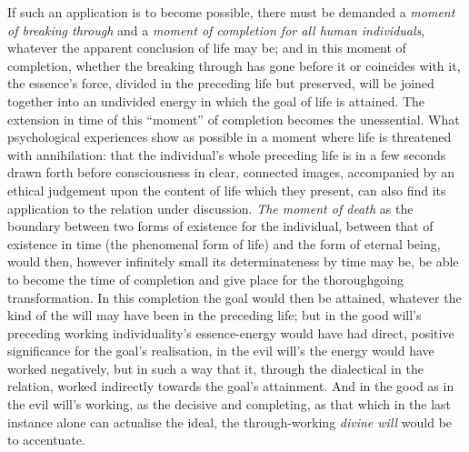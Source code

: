 \documentclass[12pt,a4paper]{book}
\begin{document}
If such an application is to become possible, there must be demanded a
\emph{moment of breaking through} and a \emph{moment of completion for all human
individuals}, whatever the apparent conclusion of life may be; and in this
moment of completion, whether the breaking through has gone before it or
coincides with it, the essence's force, divided in the preceding life but
preserved, will be joined together into an undivided energy in which the goal of
life is attained. The extension in time of this ``moment'' of completion becomes
the unessential. What psychological experiences show as possible in a moment
where life is threatened with annihilation: that the individual's whole
preceding life is in a few seconds drawn forth before consciousness in clear,
connected images, accompanied by an ethical judgement upon the content of life
which they present, can also find its application to the relation under
discussion. \emph{The moment of death} as the boundary between two forms of
existence for the individual, between that of existence in time (the phenomenal
form of life) and the form of eternal being, would then, however infinitely
small its determinateness by time may be, be able to become the time of
completion and give place for the thoroughgoing transformation. In this
completion the goal would then be attained, whatever the kind of the will may
have been in the preceding life; but in the good will's preceding working
individuality's essence-energy would have had direct, positive significance for
the goal's realisation, in the evil will's the energy would have worked
negatively, but in such a way that it, through the dialectical in the relation,
worked indirectly towards the goal's attainment. And in the good as in the evil
will's working, as the decisive and completing, as that which in the last
instance alone can actualise the ideal, the through-working \emph{divine will}
would be to accentuate.
\end{document}
